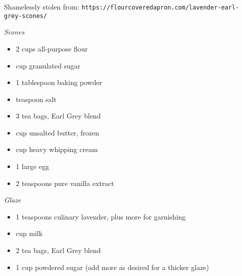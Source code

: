 
Shamelessly stolen from:
\texttt{\small https://flourcoveredapron.com/lavender-earl-grey-scones/}


\ingredients
\textit{Scones}
\begin{itemize}
    \item 2 cups all-purpose flour
    \item {} cup granulated sugar
    \item 1 tablespoon baking powder
    \item {} teaspoon salt
    \item 3 tea bags, Earl Grey blend
    \item {} cup unsalted butter, frozen
    \item {} cup heavy whipping cream
    \item 1 large egg
    \item 2 teaspoons pure vanilla extract
\end{itemize}

\textit{Glaze}
\begin{itemize}
    \item 1  teaspoons culinary lavender, plus more for garnishing
    \item {} cup milk
    \item 2 tea bags, Earl Grey blend
    \item 1  cup powdered sugar (add more as desired for a thicker glaze)
\end{itemize}


